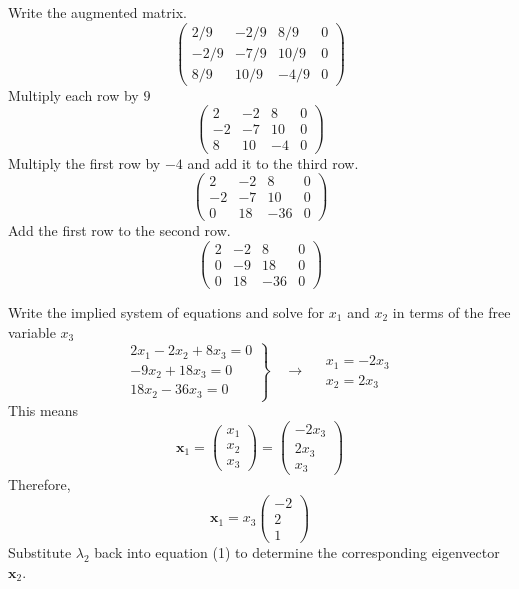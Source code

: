\documentclass[12pt]{article}
\begin{document}
Write the augmented matrix.
$$
\left(\begin{array}{rrr|r}
2 / 9 & -2 / 9 & 8 / 9 & 0 \\
-2 / 9 & -7 / 9 & 10 / 9 & 0 \\
8 / 9 & 10 / 9 & -4 / 9 & 0
\end{array}\right)
$$
Multiply each row by \(9\)
$$
\left(\begin{array}{rrr|r}
2 & -2 & 8 & 0 \\
-2 & -7 & 10 & 0 \\
8 & 10 & -4 & 0
\end{array}\right)
$$
Multiply the first row by \(-4\) and add it to the third row.
$$
\left(\begin{array}{rrr|r}
2 & -2 & 8 & 0 \\
-2 & -7 & 10 & 0 \\
0 & 18 & -36 & 0
\end{array}\right)
$$
Add the first row to the second row.
$$
\left(\begin{array}{rrr|r}
2 & -2 & 8 & 0 \\
0 & -9 & 18 & 0 \\
0 & 18 & -36 & 0
\end{array}\right)
$$

Write the implied system of equations and solve for \(x_{1}\) and \(x_{2}\) in terms
of the free variable \(x_{3}\) 
$$
\left.\begin{array}{r}
2 x_{1}-2 x_{2}+8 x_{3}=0 \\
-9 x_{2}+18 x_{3}=0 \\
18 x_{2}-36 x_{3}=0
\end{array}\right\} \quad \rightarrow \quad \begin{array}{l}
x_{1}=-2 x_{3} \\
x_{2}=2 x_{3}
\end{array}
$$
This means
$$
\mathbf{x}_{1}=\left(\begin{array}{l}
x_{1} \\
x_{2} \\
x_{3}
\end{array}\right)=\left(\begin{array}{c}
-2 x_{3} \\
2 x_{3} \\
x_{3}
\end{array}\right)
$$
Therefore,
$$
\mathbf{x}_{1}=x_{3}\left(\begin{array}{c}
-2 \\
2 \\
1
\end{array}\right)
$$
Substitute \(\lambda_{2}\) back into equation (1) to determine the corresponding eigenvector \(\mathbf{x}_{2}\).
\end{document}
